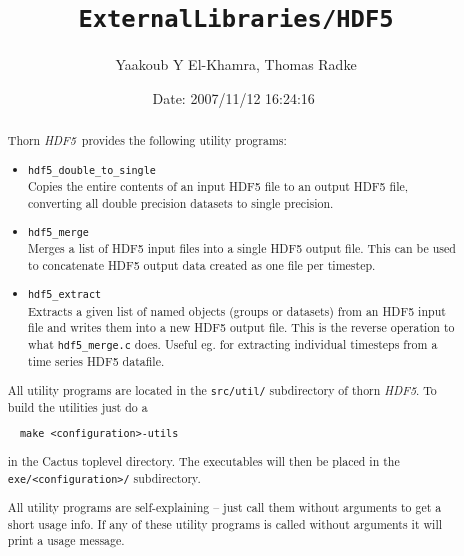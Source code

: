 \documentclass{article}
\begin{document}
\title{\tt ExternalLibraries/HDF5}
\author{Yaakoub Y El-Khamra, Thomas Radke}
\date{$ $Date: 2007/11/12 16:24:16 $ $}

\maketitle


\ifx\ThisThorn\undefined
\newcommand{\ThisThorn}{{\it HDF5}}
\else
\renewcommand{\ThisThorn}{{\it HDF5}}
\fi

\begin{abstract}
Thorn \ThisThorn\ provides the following utility programs:
%
\begin{itemize}
  \item {\tt hdf5\_double\_to\_single}\\
    Copies the entire contents of an input HDF5 file to an output HDF5 file,
    converting all double precision datasets to single precision.
  \item {\tt hdf5\_merge}\\
    Merges a list of HDF5 input files into a single HDF5 output file.
    This can be used to concatenate HDF5 output data created as one file per
    timestep.
  \item {\tt hdf5\_extract}\\
    Extracts a given list of named objects (groups or datasets) from an HDF5
    input file and writes them into a new HDF5 output file.
    This is the reverse operation to what {\tt hdf5\_merge.c} does. Useful eg.
    for extracting individual timesteps from a time series HDF5 datafile.
\end{itemize}
%
All utility programs are located in the {\tt src/util/} subdirectory of thorn
\ThisThorn. To build the utilities just do a

\begin{verbatim}
  make <configuration>-utils
\end{verbatim}

in the Cactus toplevel directory. The executables will then be placed in the
{\tt exe/<configuration>/} subdirectory.

All utility programs are self-explaining -- just call them without arguments
to get a short usage info.
If any of these utility programs is called without arguments it will print
a usage message.
\end{abstract}

\end{document}
